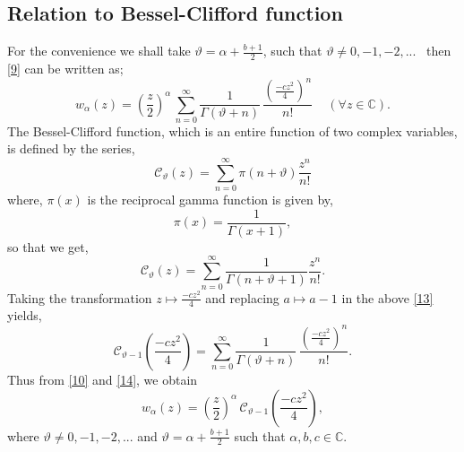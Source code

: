 \documentclass{amsart}
\theoremstyle{definition}
\theoremstyle{remark}
\numberwithin{equation}{section}
\begin{document}
\subsection{Relation to Bessel-Clifford function}
For the convenience we shall take $\vartheta = \alpha + \frac{b+1}{2}$, such that $\vartheta \neq 0, -1, -2, ...$ \, then \eqref{9} can be written as;
\begin{equation}\label{10}
  {w_{\alpha} (z) = \left(\frac{z}{2}\right)^{\alpha}\, \sum_{n=0}^{\infty} \frac{1}{\Gamma(\vartheta+n)}\, \frac{\left(\frac{-cz^{2}}{4}\right)^{n}}{n!} \,\,\,\,\,\,\, (\forall z \in \mathbb{C})}.
\end{equation}
The Bessel-Clifford function, which is an entire function of two complex variables, is defined by the series\cite{Gree, Clif, Wat},
\begin{equation}\label{11}
  \mathcal{C}_{\vartheta} (z) = \sum_{n=0}^{\infty} \pi(n+\vartheta) \frac{z^{n}}{n!}
\end{equation} where, $\pi(x)$ is the reciprocal gamma function is given by, \begin{equation}\label{12}
                        \pi(x) = \frac{1}{\Gamma(x+1)},
                      \end{equation}
so that we get,
\begin{equation}\label{13}
  {\mathcal{C}_{\vartheta} (z) = \sum_{n=0}^{\infty} \frac{1}{\Gamma(n+\vartheta+1)} \frac{z^{n}}{n!}}.
\end{equation}
Taking the transformation $z\mapsto \frac{-cz^{2}}{4}$ and replacing $a\mapsto a-1$ in the above \eqref{13} yields,
\begin{equation}\label{14}
  \mathcal{C}_{\vartheta-1} \left(\frac{-cz^{2}}{4}\right) = \sum_{n=0}^{\infty} \frac{1}{\Gamma(\vartheta+n)}\, \frac{\left(\frac{-cz^{2}}{4}\right)^{n}}{n!}.
\end{equation}
Thus from \eqref{10} and \eqref{14}, we obtain
\begin{equation}\label{15}
  w_{\alpha} (z) = \left(\frac{z}{2}\right)^{\alpha}\, \mathcal{C}_{\vartheta-1} \left(\frac{-cz^{2}}{4}\right),
\end{equation}where $\vartheta \neq0,-1,-2,...$ and $\vartheta = \alpha + \frac{b+1}{2}$ such that $\alpha,b,c \in \mathbb{C}$.
\end{document}
